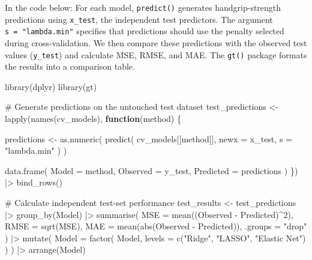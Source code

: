 \documentclass[
  letterpaper,
  DIV=11,
  numbers=noendperiod]{scrreprt}
\newenvironment{Shaded}{\begin{snugshade}}{\end{snugshade}}
\newcommand{\AttributeTok}[1]{\textcolor[rgb]{0.40,0.45,0.13}{#1}}
\newcommand{\CommentTok}[1]{\textcolor[rgb]{0.37,0.37,0.37}{#1}}
\newcommand{\ControlFlowTok}[1]{\textcolor[rgb]{0.00,0.23,0.31}{\textbf{#1}}}
\newcommand{\DecValTok}[1]{\textcolor[rgb]{0.68,0.00,0.00}{#1}}
\newcommand{\FunctionTok}[1]{\textcolor[rgb]{0.28,0.35,0.67}{#1}}
\newcommand{\NormalTok}[1]{\textcolor[rgb]{0.00,0.23,0.31}{#1}}
\newcommand{\OtherTok}[1]{\textcolor[rgb]{0.00,0.23,0.31}{#1}}
\newcommand{\SpecialCharTok}[1]{\textcolor[rgb]{0.37,0.37,0.37}{#1}}
\newcommand{\StringTok}[1]{\textcolor[rgb]{0.13,0.47,0.30}{#1}}
\begin{document}
In the code below: For each model, \texttt{predict()} generates
handgrip-strength predictions using \texttt{x\_test}, the independent
test predictors. The argument \texttt{s\ =\ "lambda.min"} specifies that
predictions should use the penalty selected during cross-validation. We
then compare these predictions with the observed test values
(\texttt{y\_test}) and calculate MSE, RMSE, and MAE. The \texttt{gt()}
package formats the results into a comparison table.

\begin{Shaded}
\begin{Highlighting}[]
\FunctionTok{library}\NormalTok{(dplyr)}
\FunctionTok{library}\NormalTok{(gt)}

\CommentTok{\# Generate predictions on the untouched test dataset}
\NormalTok{test\_predictions }\OtherTok{\textless{}{-}} \FunctionTok{lapply}\NormalTok{(}\FunctionTok{names}\NormalTok{(cv\_models), }\ControlFlowTok{function}\NormalTok{(method) \{}

\NormalTok{  predictions }\OtherTok{\textless{}{-}} \FunctionTok{as.numeric}\NormalTok{(}
    \FunctionTok{predict}\NormalTok{(}
\NormalTok{      cv\_models[[method]],}
      \AttributeTok{newx =}\NormalTok{ x\_test,}
      \AttributeTok{s =} \StringTok{"lambda.min"}
\NormalTok{    )}
\NormalTok{  )}

  \FunctionTok{data.frame}\NormalTok{(}
    \AttributeTok{Model =}\NormalTok{ method,}
    \AttributeTok{Observed =}\NormalTok{ y\_test,}
    \AttributeTok{Predicted =}\NormalTok{ predictions}
\NormalTok{  )}
\NormalTok{\}) }\SpecialCharTok{|\textgreater{}}
  \FunctionTok{bind\_rows}\NormalTok{()}

\CommentTok{\# Calculate independent test{-}set performance}
\NormalTok{test\_results }\OtherTok{\textless{}{-}}\NormalTok{ test\_predictions }\SpecialCharTok{|\textgreater{}}
  \FunctionTok{group\_by}\NormalTok{(Model) }\SpecialCharTok{|\textgreater{}}
  \FunctionTok{summarise}\NormalTok{(}
    \AttributeTok{MSE =} \FunctionTok{mean}\NormalTok{((Observed }\SpecialCharTok{{-}}\NormalTok{ Predicted)}\SpecialCharTok{\^{}}\DecValTok{2}\NormalTok{),}
    \AttributeTok{RMSE =} \FunctionTok{sqrt}\NormalTok{(MSE),}
    \AttributeTok{MAE =} \FunctionTok{mean}\NormalTok{(}\FunctionTok{abs}\NormalTok{(Observed }\SpecialCharTok{{-}}\NormalTok{ Predicted)),}
    \AttributeTok{.groups =} \StringTok{"drop"}
\NormalTok{  ) }\SpecialCharTok{|\textgreater{}}
  \FunctionTok{mutate}\NormalTok{(}
    \AttributeTok{Model =} \FunctionTok{factor}\NormalTok{(}
\NormalTok{      Model,}
      \AttributeTok{levels =} \FunctionTok{c}\NormalTok{(}\StringTok{"Ridge"}\NormalTok{, }\StringTok{"LASSO"}\NormalTok{, }\StringTok{"Elastic Net"}\NormalTok{)}
\NormalTok{    )}
\NormalTok{  ) }\SpecialCharTok{|\textgreater{}}
  \FunctionTok{arrange}\NormalTok{(Model)}


\end{Highlighting}
\end{Shaded}
\end{document}

